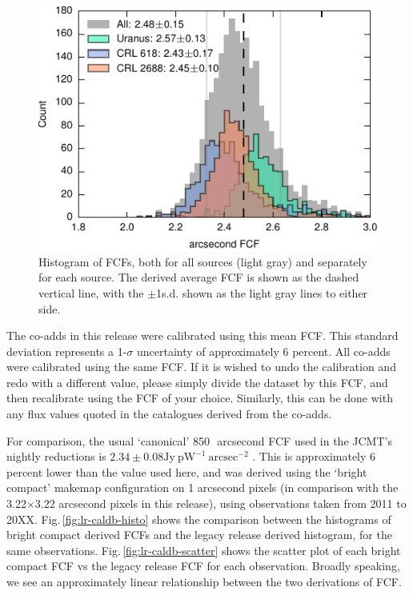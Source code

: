 \documentclass[twocolumn,times]{aastex6}
\begin{document}
\begin{figure}
  \centering
  \includegraphics{lrvalues-histo}
  \caption{Histogram of FCFs, both for all sources (light gray) and
    separately for each source. The derived average FCF is shown as
    the dashed vertical line, with the $\pm$1s.d. shown as the light
    gray lines to either side.}
  \label{fig:calibhist}
\end{figure}

The co-adds in this release were calibrated using this mean FCF.  This
standard deviation represents a 1-$\sigma$ uncertainty of
approximately 6 percent. All co-adds were calibrated using the same
FCF. If it is wished to undo the calibration and redo with a different
value, please simply divide the dataset by this FCF, and then
recalibrate using the FCF of your choice. Similarly, this can be done
with any flux values quoted in the catalogues derived from the
co-adds.%

For comparison, the usual `canonical' 850\,\micron\ arcsecond FCF used
in the JCMT's nightly reductions is $2.34 \pm 0.08 \mathrm{Jy}\
\mathrm{pW}^{-1}\ \mathrm{arcsec}^{-2}$ \citep{Dempsey2013}. This is
approximately 6 percent lower than the value used here, and was
derived using the `bright compact' makemap configuration on 1
arcsecond pixels (in comparison with the 3.22$\times$3.22 arcsecond
pixels in this release), using observations taken from 2011 to
20XX. Fig.\,\ref{fig:lr-caldb-histo} shows the comparison between the
histograms of bright compact derived FCFs and the legacy release
derived histogram, for the same
observations. Fig.\,\ref{fig:lr-caldb-scatter} shows the scatter plot
of each bright compact FCF vs the legacy release FCF for each
observation. Broadly speaking, we see an approximately linear
relationship between the two derivations of FCF.
\end{document}
